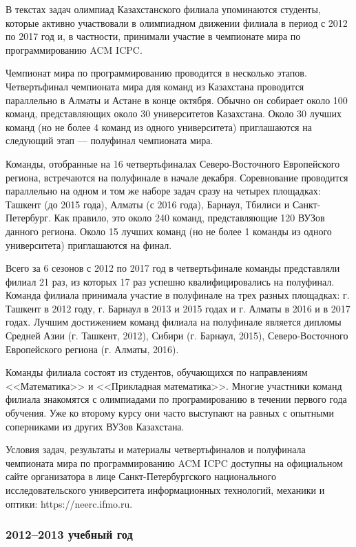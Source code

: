 В текстах задач олимпиад Казахстанского филиала упоминаются студенты, которые активно участвовали в олимпиадном движении филиала в период с 2012 по 2017 год и, в частности, принимали участие в чемпионате мира по программированию ACM ICPC.

Чемпионат мира по программированию проводится в несколько этапов. Четвертьфинал чемпионата мира для команд из Казахстана проводится параллельно в Алматы и Астане в конце октября. Обычно он собирает около 100 команд, представляющих около 30 университетов Казахстана. Около 30 лучших команд (но не более 4 команд из одного университета) приглашаются на следующий этап --- полуфинал чемпионата мира.

Команды, отобранные на 16 четвертьфиналах Северо-Восточного Европейского региона, встречаются на полуфинале в начале декабря. Соревнование проводится параллельно на одном и том же наборе задач сразу на четырех площадках: Ташкент (до 2015 года), Алматы (с 2016 года), Барнаул, Тбилиси и Санкт-Петербург. Как правило, это около 240 команд, представляющие 120 ВУЗов данного региона. Около 15 лучших команд (но не более 1 команды из одного университета) приглашаются на финал.

Всего за 6 сезонов с 2012 по 2017 год в четвертьфинале команды представляли филиал 21 раз, из которых 17 раз успешно квалифицировались на полуфинал. Команда филиала принимала участие в полуфинале на трех разных площадках: г. Ташкент в 2012 году, г. Барнаул в 2013 и 2015 годах и г. Алматы в 2016 и в 2017 годах. Лучшим достижением команд филиала на полуфинале является дипломы Средней Азии (г. Ташкент, 2012), Сибири (г. Барнаул, 2015), Северо-Восточного Европейского региона (г. Алматы, 2016).

Команды филиала состоят из студентов, обучающихся по направлениям <<Математика>> и <<Прикладная математика>>. Многие участники команд филиала знакомятся с олимпиадами по програмированию в течении первого года обучения. Уже ко второму курсу они часто выступают на равных с опытными соперниками из других ВУЗов Казахстана.

Условия задач, результаты и материалы четвертьфиналов и полуфинала чемпионата мира по программированию ACM ICPC доступны на официальном сайте организатора в лице Санкт-Петербургского национального исследовательского университета информационных технологий, механики и оптики: https://neerc.ifmo.ru.

\subsubsection*{2012--2013 учебный год}


